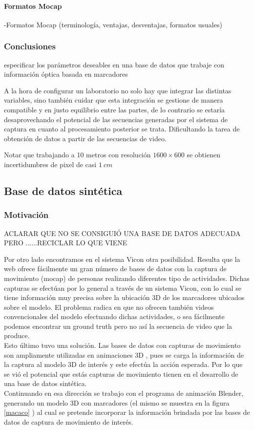 \paragraph{Formatos Mocap}
-Formatos Mocap (terminología, ventajas, desventajas, formatos usuales)
\\



\subsubsection{Conclusiones}
especificar los parámetros deseables en una base de datos que trabaje con información óptica basada en marcadores


A la hora de configurar un laboratorio no solo hay que integrar las distintas variables, sino también cuidar que esta integración se gestione de manera compatible y en justo equilibrio entre las partes, de lo contrario se estaría desaprovechando el potencial de las secuencias generadas por el sistema de captura en cuanto al procesamiento posterior se trata. Dificultando la tarea de obtención de datos a partir de las secuencias de video.

Notar que trabajando a 10 metros con resolución $1600\times600$ se obtienen incertidumbres de pixel de casi $1 ~cm $

\subsection{Base de datos sintética}
\subsubsection{Motivación}
ACLARAR QUE NO SE CONSIGUIÓ UNA BASE DE DATOS ADECUADA PERO ......RECICLAR LO QUE VIENE

Por otro lado encontramos en el sistema Vicon otra posibilidad. Resulta que la web  ofrece fácilmente un gran número de bases de datos con la captura de movimiento (mocap) de personas realizando diferentes tipo de actividades. Dichas capturas se efectúan por lo general a través de un sistema Vicon, con lo cual se tiene información muy precisa sobre la ubicación 3D de los marcadores ubicados sobre el modelo. El problema radica en que no ofrecen también videos convencionales del modelo efectuando dichas actividades, o sea fácilmente podemos encontrar un ground truth pero no así la secuencia de video que la produce.\\
Esto último tuvo una solución. Las bases de datos con capturas de movimiento son ampliamente utilizadas en animaciones 3D , pues se carga la información de la captura al modelo 3D de interés y este efectúa la acción esperada. Por lo que se vió el potencial que estás capturas de movimiento tienen en el desarrollo de una base de datos sintética.\\
Continuando en esa dirección se trabajo con el programa de animación Blender, generando un modelo 3D con marcadores (el mismo se muestra en la figura \ref{macaco} ) al cual se pretende incorporar la información brindada por las bases de datos de captura de movimiento de interés.  

